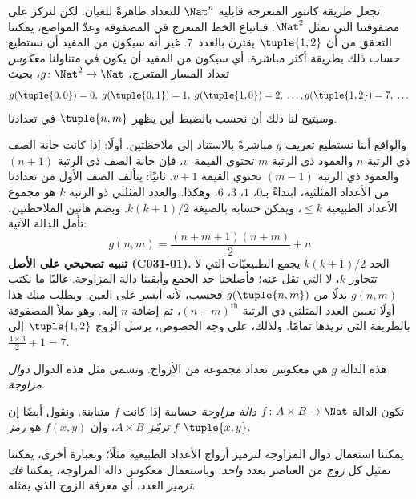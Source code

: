 \documentclass[../../../include/open-logic-section]{subfiles}
\begin{document}

\begin{explain}
تجعل طريقة كانتور المتعرجة قابلية $\Nat^n$ للتعداد ظاهرةً للعيان.
لكن لنركز على مصفوفتنا التي تمثل $\Nat^2$. فباتباع الخط المتعرج في
المصفوفة وعدّ المواضع، يمكننا التحقق من أن $\tuple{1,2}$ يقترن
بالعدد~$7$. غير أنه سيكون من المفيد أن نستطيع حساب ذلك بطريقة
أكثر مباشرة. أي سيكون من المفيد أن يكون في متناولنا \emph{معكوس}
تعداد المسار المتعرج، $g\colon \Nat^2 \to \Nat$، بحيث
\[
g(\tuple{0,0}) = 0, \;
g(\tuple{0,1}) = 1, \;
g(\tuple{1,0}) = 2, \; \dots,
g(\tuple{1,2}) = 7, \; \dots
\]
وسيتيح لنا ذلك أن نحسب بالضبط أين يظهر $\tuple{n, m}$ في تعدادنا.

والواقع أننا نستطيع تعريف $g$ مباشرةً بالاستناد إلى ملاحظتين. أولًا:
إذا كانت خانة الصف ذي الرتبة $n$ والعمود ذي الرتبة $m$ تحتوي
القيمة~$v$، فإن خانة الصف ذي الرتبة $(n+1)$ والعمود ذي الرتبة
$(m-1)$ تحتوي القيمة $v + 1$. ثانيًا: يتألف الصف الأول من تعدادنا
من الأعداد المثلثية، ابتداءً بـ$0$، $1$، $3$، $6$، وهكذا. والعدد
المثلثي ذو الرتبة $k$ هو مجموع الأعداد الطبيعية $\leq k$، ويمكن حسابه
بالصيغة $k(k+1)/2$. وبضم هاتين الملاحظتين، تأمل الدالة الآتية:
\[
  g(n,m) = \frac{(n+m+1)(n+m)}{2} + n
\]
\textbf{تنبيه تصحيحي على الأصل (C031-01).} الحد $k(k+1)/2$ يجمع الطبيعيّات التي
لا تتجاوز $k$، لا التي تقل عنه؛ فأصلحنا حد الجمع وأبقينا دالة المزاوجة.
غالبًا ما نكتب $g(n, m)$ بدلًا من $g(\tuple{n, m})$ فحسب، لأنه أيسر
على العين. ويطلب منك هذا أولًا تعيين العدد المثلثي ذي الرتبة
$(n+m)^\text{th}$، ثم إضافة $n$ إليه. وهو يملأ المصفوفة بالطريقة
التي نريدها تمامًا. ولذلك، على وجه الخصوص، يرسل الزوج
$\tuple{1, 2}$ إلى $\frac{4 \times 3}{2} +
1 = 7$.

هذه الدالة $g$ هي \emph{معكوس} تعداد مجموعة من الأزواج. وتسمى مثل
هذه الدوال \emph{دوال مزاوجة}.
\end{explain}

\begin{defn}
  تكون الدالة $f\colon A \times B \to \Nat$ \emph{دالة مزاوجة}
  حسابية إذا كانت $f$ متباينة. ونقول أيضًا إن $f$ \emph{ترمّز}
  $A \times B$، وإن $f(x,y)$ هو \emph{رمز} $\tuple{x,y}$.
\end{defn}

\begin{explain}
يمكننا استعمال دوال المزاوجة لترميز أزواج الأعداد الطبيعية مثلًا؛
وبعبارة أخرى، يمكننا تمثيل كل \emph{زوج} من العناصر بعدد
\emph{واحد}. وباستعمال معكوس دالة المزاوجة، يمكننا \emph{فك ترميز}
العدد، أي معرفة الزوج الذي يمثله.
\end{explain}
\end{document}

